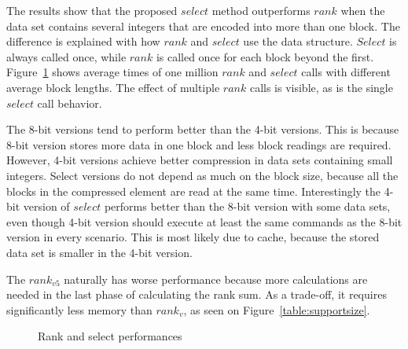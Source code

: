 The results show that the proposed $select$ method outperforms $rank$ when the data set contains several integers that are encoded into more than one block. The difference is explained 
with how $rank$ and $select$ use the data structure. $Select$ is always called once, while $rank$ is called once for each block beyond the first. Figure~\ref{graph:data_comparison} shows average times
of one million $rank$ and $select$ calls with different average block lengths. The effect of multiple $rank$ calls is visible, as is the single $select$ call behavior. 

The 8-bit versions tend to perform better than the 4-bit versions. This is because 8-bit version stores more data in one block and less block readings are required. However, 4-bit versions achieve 
better compression in data sets containing small integers. Select versions do not depend as much on the block size, because all the blocks in the compressed element are read at the same time. 
Interestingly the 4-bit version of $select$ performs better than the 8-bit version with some data sets, even though 4-bit version should execute at least the same commands as the 8-bit version 
in every scenario. This is most likely due to cache, because the stored data set is smaller in the 4-bit version.

The $rank_{v5}$ naturally has worse performance because more calculations are needed in the last phase of calculating the rank sum. As a trade-off, it requires 
significantly less memory than $rank_v$, as seen on Figure~\ref{table:supportsize}.

\begin{figure}[ht]
\centering
{}
\caption{Rank and select performances} \label{graph:data_comparison}
\end{figure}

